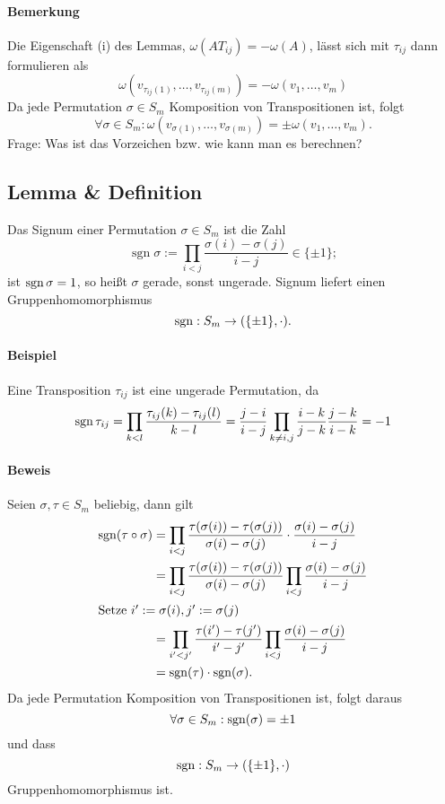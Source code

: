  	\paragraph{Bemerkung}
 		Die Eigenschaft (i) des Lemmas, $ \omega(AT_{ij})=-\omega(A) $, lässt sich mit $ \tau_{ij} $ dann formulieren als
 		\[
 			\omega(v_{\tau_{ij}(1)}, \dots, v_{\tau_{ij}(m)}) = - \omega(v_1,\dots,v_m)
 		\]
 		Da jede Permutation $ \sigma\in S_m $ Komposition von Transpositionen ist, folgt
 		\[
 			\forall \sigma\in S_m: \omega(v_{\sigma(1)},\dots,v_{\sigma(m)})=\pm \omega(v_1,\dots,v_{m}).
 		\]
 		Frage: Was ist das Vorzeichen bzw. wie kann man es berechnen?
 \subsection{Lemma \& Definition}
 	\begin{Definition}
 		Das Signum einer Permutation $ \sigma\in S_m $ ist die Zahl
 		\[
 			\operatorname{sgn}\sigma := \prod_{i<j} \frac{\sigma(i)-\sigma(j)}{i-j}\in \{\pm 1\};
 		\]
 		ist $ \operatorname{sgn}\sigma = 1 $, so heißt $ \sigma $ gerade, sonst ungerade. Signum liefert einen Gruppenhomomorphismus
 		\[
 			\operatorname{sgn}: S_m\to (\{\pm 1\},\cdot).
 		\]
 	\end{Definition}
 	\paragraph{Beispiel}
 		Eine Transposition $ \tau_{ij} $ ist eine ungerade Permutation, da
 		\[
 			\operatorname{sgn}\tau_{ij} = \prod_{k<l}\frac{\tau_{ij}(k)-\tau_{ij}(l)}{k-l} = \frac{j-i}{i-j}\prod_{k\neq i,j}\frac{i-k}{j-k}\frac{j-k}{i-k} = -1
 		\]

 	\paragraph{Beweis}
 		Seien $ \sigma,\tau\in S_m $ beliebig, dann gilt
 		\begin{align*} \operatorname{sgn}(\tau\circ\sigma) &= \prod_{i<j}\frac{\tau(\sigma(i))-\tau(\sigma(j))}{\sigma(i)-\sigma(j)}\cdot\frac{\sigma(i)-\sigma(j)}{i-j} \\
 			  & = \prod_{i<j}\frac{\tau(\sigma(i))-\tau(\sigma(j))}{\sigma(i)-\sigma(j)}\prod_{i<j}\frac{\sigma(i)-\sigma(j)}{i-j} \\
 			\intertext{Setze $i':=\sigma(i), j':=\sigma(j) $}
 			  & =\prod_{i'<j'}\frac{\tau(i')-\tau(j')}{i'-j'}\prod_{i<j}\frac{\sigma(i)-\sigma(j)}{i-j}                            \\
 			  & = \operatorname{sgn}(\tau)\cdot \operatorname{sgn}(\sigma).
 		\end{align*}
 		Da jede Permutation Komposition von Transpositionen ist, folgt daraus
 		\[
 			\forall \sigma \in S_m:\operatorname{sgn}(\sigma) = \pm 1
 		\]
 		und dass
 		\[
 			\operatorname{sgn}:S_m \to (\{\pm 1\},\cdot)
 		\]
 		Gruppenhomomorphismus ist.
